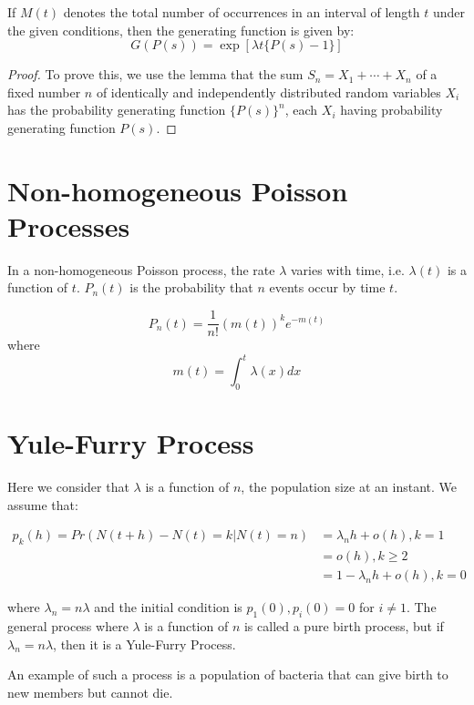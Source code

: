 \documentclass[12pt,letterpaper]{book}
\theoremstyle{definition}
\begin{document}
\begin{theorem}
  If $M(t)$ denotes the total number of occurrences in an interval of length $t$ under the given conditions, then the generating function is given by:
  \[G(P(s)) = \exp [\lambda t \{P(s)-1\}]\]
\end{theorem}
\begin{proof}
  To prove this, we use the lemma that the sum $S_n = X_1 + \cdots + X_n$ of a fixed number $n$ of identically and independently distributed random variables $X_i$ has the probability generating function $\{P(s)\}^n$, each $X_i$ having probability generating function $P(s)$.
\end{proof}

\section{Non-homogeneous Poisson Processes}

In a non-homogeneous Poisson process, the rate $\lambda$ varies with time, i.e. $\lambda(t)$ is a function of $t$. $P_n(t)$ is the probability that $n$ events occur by time $t$.

\begin{theorem}
  \[P_n(t) = \frac{1}{n!} (m(t))^k e^{-m(t)}\] 
  where
  \[m(t) = \int_0^t \lambda(x) dx\]
\end{theorem}

\section{Yule-Furry Process}

Here we consider that $\lambda$ is a function of $n$, the population size at an instant. We assume that:

\begin{align*}
  p_k(h) = Pr(N(t+h) - N(t) = k | N(t) = n) &= \lambda_n h + o(h), k = 1\\
                                            &= o(h), k \geq 2\\
                                            &= 1 - \lambda_nh + o(h), k = 0
\end{align*}

where $\lambda_n = n \lambda$ and the initial condition is $p_1(0), p_i(0) = 0$ for $i \neq 1$. The general process where $\lambda$ is a function of $n$ is called a pure birth process, but if $\lambda_n = n \lambda$, then it is a Yule-Furry Process.

An example of such a process is a population of bacteria that can give birth to new members but cannot die. 
\end{document}
